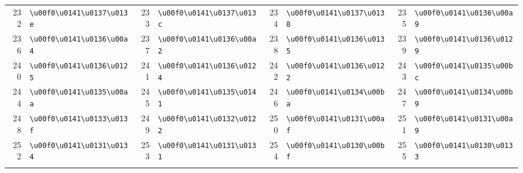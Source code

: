 \begin{table}[!htbp]
\begin{tabular}{r l r l r l r l}
232 & \texttt{\textbackslash{}u00f0\textbackslash{}u0141\textbackslash{}u0137\textbackslash{}u013e} & 233 & \texttt{\textbackslash{}u00f0\textbackslash{}u0141\textbackslash{}u0137\textbackslash{}u013c} & 234 & \texttt{\textbackslash{}u00f0\textbackslash{}u0141\textbackslash{}u0137\textbackslash{}u0138} & 235 & \texttt{\textbackslash{}u00f0\textbackslash{}u0141\textbackslash{}u0136\textbackslash{}u00a9} \\
236 & \texttt{\textbackslash{}u00f0\textbackslash{}u0141\textbackslash{}u0136\textbackslash{}u00a4} & 237 & \texttt{\textbackslash{}u00f0\textbackslash{}u0141\textbackslash{}u0136\textbackslash{}u00a2} & 238 & \texttt{\textbackslash{}u00f0\textbackslash{}u0141\textbackslash{}u0136\textbackslash{}u0135} & 239 & \texttt{\textbackslash{}u00f0\textbackslash{}u0141\textbackslash{}u0136\textbackslash{}u0129} \\
240 & \texttt{\textbackslash{}u00f0\textbackslash{}u0141\textbackslash{}u0136\textbackslash{}u0125} & 241 & \texttt{\textbackslash{}u00f0\textbackslash{}u0141\textbackslash{}u0136\textbackslash{}u0124} & 242 & \texttt{\textbackslash{}u00f0\textbackslash{}u0141\textbackslash{}u0136\textbackslash{}u0122} & 243 & \texttt{\textbackslash{}u00f0\textbackslash{}u0141\textbackslash{}u0135\textbackslash{}u00bc} \\
244 & \texttt{\textbackslash{}u00f0\textbackslash{}u0141\textbackslash{}u0135\textbackslash{}u00aa} & 245 & \texttt{\textbackslash{}u00f0\textbackslash{}u0141\textbackslash{}u0135\textbackslash{}u0141} & 246 & \texttt{\textbackslash{}u00f0\textbackslash{}u0141\textbackslash{}u0134\textbackslash{}u00ba} & 247 & \texttt{\textbackslash{}u00f0\textbackslash{}u0141\textbackslash{}u0134\textbackslash{}u00b9} \\
248 & \texttt{\textbackslash{}u00f0\textbackslash{}u0141\textbackslash{}u0133\textbackslash{}u013f} & 249 & \texttt{\textbackslash{}u00f0\textbackslash{}u0141\textbackslash{}u0132\textbackslash{}u0122} & 250 & \texttt{\textbackslash{}u00f0\textbackslash{}u0141\textbackslash{}u0131\textbackslash{}u00af} & 251 & \texttt{\textbackslash{}u00f0\textbackslash{}u0141\textbackslash{}u0131\textbackslash{}u00a9} \\
252 & \texttt{\textbackslash{}u00f0\textbackslash{}u0141\textbackslash{}u0131\textbackslash{}u0134} & 253 & \texttt{\textbackslash{}u00f0\textbackslash{}u0141\textbackslash{}u0131\textbackslash{}u0131} & 254 & \texttt{\textbackslash{}u00f0\textbackslash{}u0141\textbackslash{}u0130\textbackslash{}u00bf} & 255 & \texttt{\textbackslash{}u00f0\textbackslash{}u0141\textbackslash{}u0130\textbackslash{}u0133} \\
\addlinespace[4pt]  
\bottomrule
\end{tabular}
\end{table}